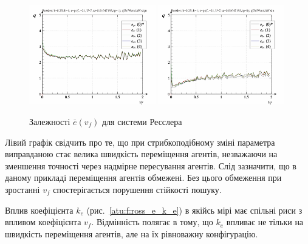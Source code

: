 \begin{figure}[ht!]
\begin{center}
  \includegraphics[width=0.49\textwidth]{p/cha/ross/ross_id-p_v_f_ql3rlWvnAAW_sign.png}
  \hfill
  \includegraphics[width=0.49\textwidth]{p/cha/ross/ross_id-p_v_f_ql3rlWvnAAW_sin.png}
\end{center}
\caption{Залежності $ \overline{e} (v_f) $ для системи Ресслера}
\label{atu:f:ross_e_v_f}
\end{figure}

Лівий графік свідчить про те, що при стрибкоподібному зміні
параметра виправданою стає велика швидкість переміщення
агентів, незважаючи на зменшення точності через надмірне
пересування агентів. Слід зазначити, що в даному прикладі
переміщення агентів обмежені. Без цього обмеження при зростанні
$ v_f $ спостерігається порушення стійкості пошуку.

Вплив коефіцієнта
$ k_e $ (рис.~\ref{atu:f:ross_e_k_e}) в якійсь мірі має спільні риси
з впливом коефіцієнта
$ v_f $. Відмінність полягає в тому, що
$ k_e $ впливає не тільки на швидкість переміщення агентів, але
на їх рівноважну конфігурацію.

